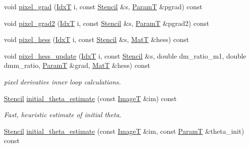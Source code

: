 \begin{DoxyCompactItemize}
\item 
void \hyperlink{classmappel_1_1Gauss1DModel_ae17d888bf89ea80c39c9839144015b55}{pixel\+\_\+grad} (\hyperlink{namespacemappel_ab17ec0f30b61ece292439d7ece81d3a8}{IdxT} i, const \hyperlink{classmappel_1_1Gauss1DModel_1_1Stencil}{Stencil} \&s, \hyperlink{classmappel_1_1PointEmitterModel_a665ec6aea3aac139bb69a23c06d4b9a1}{ParamT} \&pgrad) const 
\item 
void \hyperlink{classmappel_1_1Gauss1DModel_aeb6090ca6812629d8b719ed9a45cf7f3}{pixel\+\_\+grad2} (\hyperlink{namespacemappel_ab17ec0f30b61ece292439d7ece81d3a8}{IdxT} i, const \hyperlink{classmappel_1_1Gauss1DModel_1_1Stencil}{Stencil} \&s, \hyperlink{classmappel_1_1PointEmitterModel_a665ec6aea3aac139bb69a23c06d4b9a1}{ParamT} \&pgrad2) const 
\item 
void \hyperlink{classmappel_1_1Gauss1DModel_a407773f7ffe464018fbaa18e8c8fe22a}{pixel\+\_\+hess} (\hyperlink{namespacemappel_ab17ec0f30b61ece292439d7ece81d3a8}{IdxT} i, const \hyperlink{classmappel_1_1Gauss1DModel_1_1Stencil}{Stencil} \&s, \hyperlink{namespacemappel_a7091ab87c528041f7e2027195fad8915}{MatT} \&hess) const 
\item 
void \hyperlink{classmappel_1_1Gauss1DModel_a6b0a57e7620ef80030c94903aae5954f}{pixel\+\_\+hess\+\_\+update} (\hyperlink{namespacemappel_ab17ec0f30b61ece292439d7ece81d3a8}{IdxT} i, const \hyperlink{classmappel_1_1Gauss1DModel_1_1Stencil}{Stencil} \&s, double dm\+\_\+ratio\+\_\+m1, double dmm\+\_\+ratio, \hyperlink{classmappel_1_1PointEmitterModel_a665ec6aea3aac139bb69a23c06d4b9a1}{ParamT} \&grad, \hyperlink{namespacemappel_a7091ab87c528041f7e2027195fad8915}{MatT} \&hess) const 
\begin{DoxyCompactList}\small\item\em pixel derivative inner loop calculations. \end{DoxyCompactList}\item 
\hyperlink{classmappel_1_1Gauss1DModel_1_1Stencil}{Stencil} \hyperlink{classmappel_1_1Gauss1DModel_a055a3bd9bc0ff8540a48a1c6f50ec523}{initial\+\_\+theta\+\_\+estimate} (const \hyperlink{classmappel_1_1ImageFormat1DBase_a521a1ff391a52a636fac4aac7c7ba02c}{ImageT} \&im) const 
\begin{DoxyCompactList}\small\item\em Fast, heuristic estimate of initial theta. \end{DoxyCompactList}\item 
\hyperlink{classmappel_1_1Gauss1DModel_1_1Stencil}{Stencil} \hyperlink{classmappel_1_1Gauss1DModel_a4c4e01a489a6d8f7b119dd50b51610c2}{initial\+\_\+theta\+\_\+estimate} (const \hyperlink{classmappel_1_1ImageFormat1DBase_a521a1ff391a52a636fac4aac7c7ba02c}{ImageT} \&im, const \hyperlink{classmappel_1_1PointEmitterModel_a665ec6aea3aac139bb69a23c06d4b9a1}{ParamT} \&theta\+\_\+init) const 

\end{DoxyCompactItemize}

